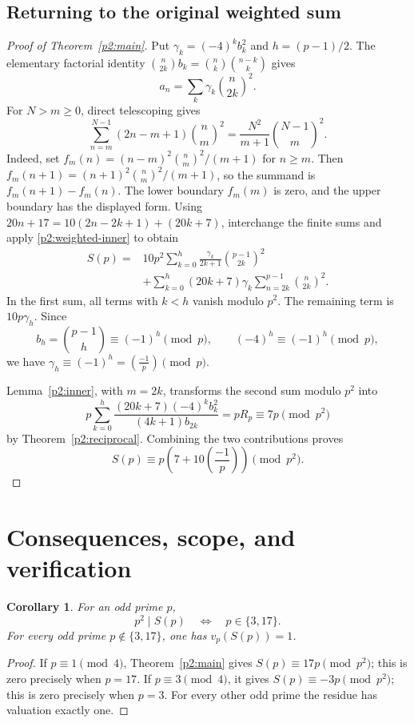 \documentclass[11pt,a4paper]{article}
\newtheorem{corollary}[theorem]{Corollary}
\theoremstyle{remark}\newtheorem{remark}[theorem]{Remark}
\begin{document}
\subsection{Returning to the original weighted sum}

\begin{proof}[Proof of Theorem~\ref{p2:main}]
Put \(\gamma_k=(-4)^k b_k^2\) and \(h=(p-1)/2\).
The elementary factorial identity
\(\binom n{2k}b_k=\binom nk\binom{n-k}k\) gives
\[
 a_n=\sum_k\gamma_k\binom n{2k}^2.
\]
For \(N>m\ge0\), direct telescoping gives
\begin{equation}\label{p2:weighted-inner}
 \sum_{n=m}^{N-1}(2n-m+1)\binom nm^2
                    =\frac{N^2}{m+1}\binom{N-1}m^2.
\end{equation}
Indeed, set \(f_m(n)=(n-m)^2\binom nm^2/(m+1)\) for \(n\ge m\).
Then \(f_m(n+1)=(n+1)^2\binom nm^2/(m+1)\), so the summand is
\(f_m(n+1)-f_m(n)\). The lower boundary \(f_m(m)\) is zero,
and the upper boundary has the displayed form.
Using \(20n+17=10(2n-2k+1)+(20k+7)\), interchange the finite sums
and apply \eqref{p2:weighted-inner} to obtain
\[
\begin{split}
 S(p)={}&10p^2\sum_{k=0}^h
          \frac{\gamma_k}{2k+1}\binom{p-1}{2k}^2\\
       &+\sum_{k=0}^h(20k+7)\gamma_k
                           \sum_{n=2k}^{p-1}\binom n{2k}^2.
\end{split}
\]
In the first sum, all terms with \(k<h\) vanish modulo \(p^2\).
The remaining term is \(10p\gamma_h\). Since
\[
 b_h=\binom{p-1}h\equiv(-1)^h\pmod p,\qquad
 (-4)^h\equiv(-1)^h\pmod p,
\]
we have \(\gamma_h\equiv(-1)^h=(\frac{-1}{p})\pmod p\).

Lemma~\ref{p2:inner}, with \(m=2k\), transforms the second sum modulo
\(p^2\) into
\[
 p\sum_{k=0}^h\frac{(20k+7)(-4)^k b_k^2}{(4k+1)b_{2k}}
                      =pR_p\equiv7p\pmod{p^2}
\]
by Theorem~\ref{p2:reciprocal}. Combining the two contributions proves
\[
                    S(p)\equiv p\left(7+10\left(\frac{-1}{p}\right)\right)
                    \pmod{p^2}.
\]
\end{proof}


\section{Consequences, scope, and verification}

\begin{corollary}\label{cor:exceptions}
For an odd prime \(p\),
\[
 p^2\mid S(p)\quad\Longleftrightarrow\quad p\in\{3,17\}.
\]
For every odd prime \(p\notin\{3,17\}\), one has
\(v_p(S(p))=1\).
\end{corollary}
\begin{proof}
If \(p\equiv1\pmod4\), Theorem~\ref{p2:main} gives
\(S(p)\equiv17p\pmod{p^2}\); this is zero precisely when \(p=17\).
If \(p\equiv3\pmod4\), it gives
\(S(p)\equiv-3p\pmod{p^2}\); this is zero precisely when \(p=3\).
For every other odd prime the residue has valuation exactly one.
\end{proof}
\end{document}
